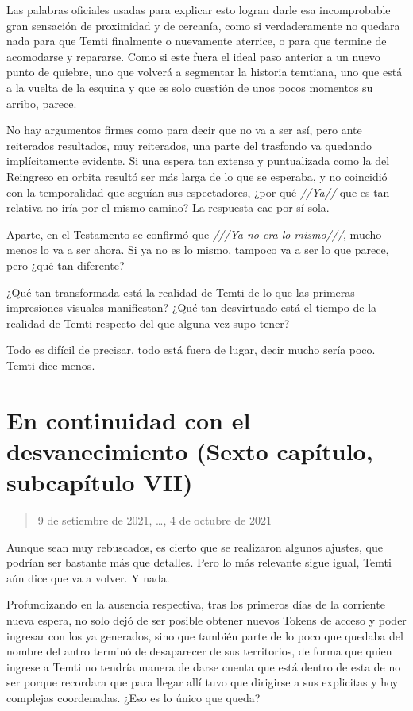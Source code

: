 \documentclass[
  spanish,
]{book}
\begin{document}
Las palabras oficiales usadas para explicar esto logran darle esa incomprobable gran sensación de proximidad y de cercanía, como si verdaderamente no quedara nada para que Temti finalmente o nuevamente aterrice, o para que termine de acomodarse y repararse. Como si este fuera el ideal paso anterior a un nuevo punto de quiebre, uno que volverá a segmentar la historia temtiana, uno que está a la vuelta de la esquina y que es solo cuestión de unos pocos momentos su arribo, parece.

No hay argumentos firmes como para decir que no va a ser así, pero ante reiterados resultados, muy reiterados, una parte del trasfondo va quedando implícitamente evidente. Si una espera tan extensa y puntualizada como la del Reingreso en orbita resultó ser más larga de lo que se esperaba, y no coincidió con la temporalidad que seguían sus espectadores, ¿por qué \emph{//Ya//} que es tan relativa no iría por el mismo camino? La respuesta cae por sí sola.

Aparte, en el Testamento se confirmó que \emph{///Ya no era lo mismo///}, mucho menos lo va a ser ahora. Si ya no es lo mismo, tampoco va a ser lo que parece, pero ¿qué tan diferente?

¿Qué tan transformada está la realidad de Temti de lo que las primeras impresiones visuales manifiestan? ¿Qué tan desvirtuado está el tiempo de la realidad de Temti respecto del que alguna vez supo tener?

Todo es difícil de precisar, todo está fuera de lugar, decir mucho sería poco. Temti dice menos.

\hypertarget{en-continuidad-con-el-desvanecimiento-sexto-capuxedtulo-subcapuxedtulo-vii}{%
\section{En continuidad con el desvanecimiento (Sexto capítulo, subcapítulo VII)}\label{en-continuidad-con-el-desvanecimiento-sexto-capuxedtulo-subcapuxedtulo-vii}}

\begin{quote}
9 de setiembre de 2021, \ldots, 4 de octubre de 2021
\end{quote}

Aunque sean muy rebuscados, es cierto que se realizaron algunos ajustes, que podrían ser bastante más que detalles. Pero lo más relevante sigue igual, Temti aún dice que va a volver. Y nada.

Profundizando en la ausencia respectiva, tras los primeros días de la corriente nueva espera, no solo dejó de ser posible obtener nuevos Tokens de acceso y poder ingresar con los ya generados, sino que también parte de lo poco que quedaba del nombre del antro terminó de desaparecer de sus territorios, de forma que quien ingrese a Temti no tendría manera de darse cuenta que está dentro de esta de no ser porque recordara que para llegar allí tuvo que dirigirse a sus explicitas y hoy complejas coordenadas. ¿Eso es lo único que queda?
\end{document}
